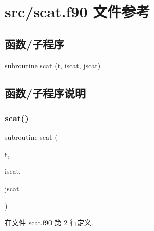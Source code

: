 \hypertarget{scat_8f90}{}\section{src/scat.f90 文件参考}
\label{scat_8f90}
\subsection*{函数/子程序}
\begin{DoxyCompactItemize}
\item 
subroutine \mbox{\hyperlink{scat_8f90_aca132ea02f1241f593836b016c71c848}{scat}} (t, iscat, jscat)
\end{DoxyCompactItemize}


\subsection{函数/子程序说明}
\mbox{\label{scat_8f90_aca132ea02f1241f593836b016c71c848}} 
\subsubsection{\texorpdfstring{scat()}{scat()}}
{\footnotesize\ttfamily subroutine scat (\begin{DoxyParamCaption}\item[{}]{t,  }\item[{}]{iscat,  }\item[{}]{jscat }\end{DoxyParamCaption})}



在文件 scat.\+f90 第 2 行定义.

